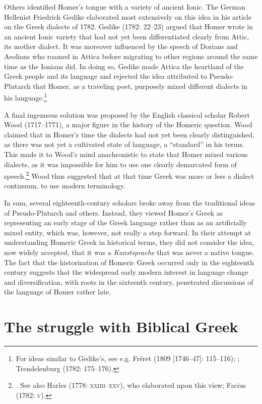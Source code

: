 Others identified Homer’s tongue with a variety of ancient Ionic. The German Hellenist Friedrich Gedike elaborated most extensively on this idea in his article on the Greek dialects of 1782. Gedike (1782: 22–23) argued that Homer wrote in an ancient Ionic variety that had not yet been differentiated clearly from Attic, its mother dialect. It was moreover influenced by the speech of Dorians and Aeolians who roamed in Attica before migrating to other regions around the same time as the Ionians did. In doing so, Gedike made Attica the heartland of the Greek people and its language and rejected the idea attributed to Pseudo-Plutarch that Homer, as a traveling poet, purposely mixed different dialects in his language.\footnote{For ideas similar to Gedike’s, see e.g. Fréret (1809 [1746–47]: 115–116); \citet[202]{Beattie1778}; Trendelenburg (1782: 175–176).}

A final ingenuous solution was proposed by the English classical scholar Robert Wood (1717–1771), a major figure in the history of the Homeric question. Wood claimed that in Homer’s time the dialects had not yet been clearly distinguished, as there was not yet a cultivated state of language, a “standard” in his terms. This made it to Wood’s mind anachronistic to state that Homer mixed various dialects, as it was impossible for him to use one clearly demarcated form of speech.\footnote{\citet[238]{Wood1775}. See also Harles (1778: \textsc{xxiiii–xxv)}, who elaborated upon this view; Facius (1782: \textsc{v}).} Wood thus suggested that at that time Greek was more or less a dialect continuum, to use modern terminology.

In sum, several eighteenth-century scholars broke away from the traditional ideas of Pseudo-Plutarch and others. Instead, they viewed Homer’s Greek as representing an early stage of the Greek language rather than as an artificially mixed entity, which was, however, not really a step forward. In their attempt at understanding Homeric Greek in historical terms, they did not consider the idea, now widely accepted, that it was a \textit{Kunstsprache} that was never a native tongue. The fact that the historization of Homeric Greek occurred only in the eighteenth century suggests that the widespread early modern interest in language change and diversification, with roots in the sixteenth century, penetrated discussions of the language of Homer rather late.

\section{The struggle with Biblical Greek}

